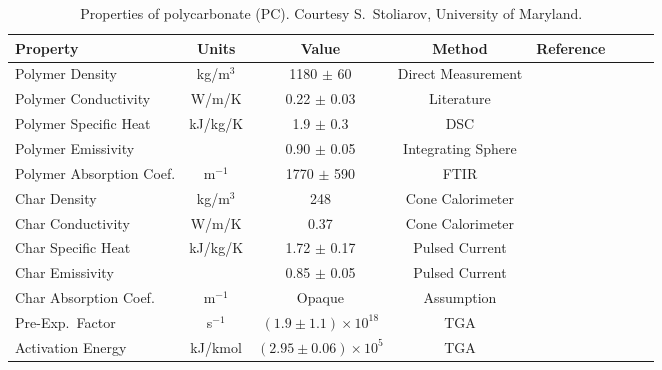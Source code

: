 \begin{table}[h!]
\caption[Properties of polycarbonate (PC).]{Properties of polycarbonate (PC). Courtesy S.~Stoliarov, University of Maryland.}
\begin{center}
\begin{tabular}{|l|c|c|c|c|c|l|l|}
\hline
Property                    & Units         & Value                             & Method                &  Reference                    \\ \hline \hline
Polymer Density             & kg/m$^3$      & 1180 $\pm$ 60                     & Direct Measurement    &  \cite{Stoliarov:CF2010}      \\ \hline
Polymer Conductivity        & W/m/K         & 0.22 $\pm$ 0.03                   & Literature            &  \cite{Stoliarov:CF2010}      \\ \hline
Polymer Specific Heat       & kJ/kg/K       & 1.9 $\pm$ 0.3                     & DSC                   &  \cite{Stoliarov:PDS2008}     \\ \hline
Polymer Emissivity          &               & 0.90 $\pm$ 0.05                   &Integrating  Sphere                &  \cite{Hallman:PES1974}       \\ \hline
Polymer Absorption Coef.    & m$^{-1}$      & 1770 $\pm$ 590                    & FTIR                  &  \cite{Tsilingiris:ECM2003}   \\ \hline
Char Density                & kg/m$^3$      & 248                               & Cone Calorimeter      &  \cite{Stoliarov:CF2010}      \\ \hline
Char Conductivity           & W/m/K         & 0.37                              & Cone Calorimeter      &  \cite{Stoliarov:CF2010}      \\ \hline
Char Specific Heat          & kJ/kg/K       & 1.72 $\pm$ 0.17                   & Pulsed Current        &  \cite{Stoliarov:CF2010,Matsumoto:1996}  \\ \hline
Char Emissivity             &               & 0.85 $\pm$ 0.05                   & Pulsed Current        &  \cite{Stoliarov:CF2010,Matsumoto:1996}  \\ \hline
Char Absorption Coef.       & m$^{-1}$      & Opaque                            & Assumption            &  \cite{Stoliarov:CF2010}      \\ \hline
Pre-Exp.~Factor             & s$^{-1}$      & $(1.9 \pm 1.1) \times 10^{18}$    & TGA                   &  \cite{Stoliarov:CF2010}      \\ \hline
Activation Energy           & kJ/kmol       & $(2.95 \pm 0.06) \times 10^{5}$   & TGA                   &  \cite{Stoliarov:CF2010}      \\ \hline

\end{tabular}
\end{center}
\end{table}
